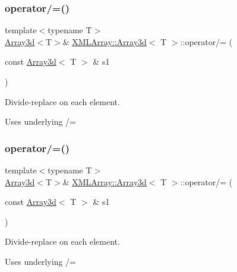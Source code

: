 \subsubsection{\texorpdfstring{operator/=()}{operator/=()}\hspace{0.1cm}{\footnotesize\ttfamily [1/6]}}
{\footnotesize\ttfamily template$<$typename T$>$ \\
\mbox{\hyperlink{classXMLArray_1_1Array3d}{Array3d}}$<$T$>$\& \mbox{\hyperlink{classXMLArray_1_1Array3d}{X\+M\+L\+Array\+::\+Array3d}}$<$ T $>$\+::operator/= (\begin{DoxyParamCaption}\item[{const \mbox{\hyperlink{classXMLArray_1_1Array3d}{Array3d}}$<$ T $>$ \&}]{s1 }\end{DoxyParamCaption})\hspace{0.3cm}{\ttfamily [inline]}}



Divide-\/replace on each element. 

Uses underlying /= \mbox{\label{classXMLArray_1_1Array3d_a67c611b25c5969b9b340959fde49f602}} 
\subsubsection{\texorpdfstring{operator/=()}{operator/=()}\hspace{0.1cm}{\footnotesize\ttfamily [2/6]}}
{\footnotesize\ttfamily template$<$typename T$>$ \\
\mbox{\hyperlink{classXMLArray_1_1Array3d}{Array3d}}$<$T$>$\& \mbox{\hyperlink{classXMLArray_1_1Array3d}{X\+M\+L\+Array\+::\+Array3d}}$<$ T $>$\+::operator/= (\begin{DoxyParamCaption}\item[{const \mbox{\hyperlink{classXMLArray_1_1Array3d}{Array3d}}$<$ T $>$ \&}]{s1 }\end{DoxyParamCaption})\hspace{0.3cm}{\ttfamily [inline]}}



Divide-\/replace on each element. 

Uses underlying /= \mbox{\label{classXMLArray_1_1Array3d_a67c611b25c5969b9b340959fde49f602}} 
